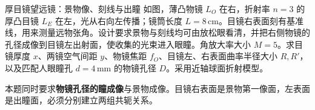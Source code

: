 \begin{advexamplebox}{厚目镜望远镜：景物像、刻线与出瞳}\label{advA5:ex:thick-eyepiece}
如图，薄凸物镜 $L_O$ 在右，折射率 $n=3$ 的厚凸目镜 $L_E$ 在左，光从右向左传播；镜筒长度 $L=8\,\mathrm{cm}$。目镜右表面刻有基准线，用来测量远物张角。设计要求景物与刻线均可由放松眼看清，并把右侧物镜的孔径成像到目镜左出射面，使收集的光束进入眼瞳。角放大率大小 $M=5$。求目镜厚度 $x$、两镜空气间距 $y$、物镜焦距 $f_O$、目镜左、右表面曲率半径大小 $R,R'$，以及匹配人眼瞳孔 $d=4\,\mathrm{mm}$ 的物镜孔径 $D$。采用近轴球面折射模型。

\end{advexamplebox}
\begin{advsolution}
本题同时要求\textbf{物镜孔径的瞳成像}与景物成像。目镜右表面是景物第一像面，左表面是出瞳面，必须分别建立两组共轭关系。


\end{advsolution}

